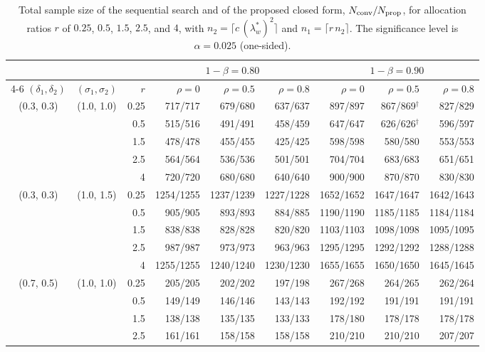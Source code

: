 \begin{table}[ht]
\centering
\footnotesize
\setlength{\tabcolsep}{4pt}
\caption{Total sample size of the sequential search and of the proposed closed form, $N_{\rm conv}/N_{\rm prop}$, for allocation ratios $r$ of $0.25$, $0.5$, $1.5$, $2.5$, and $4$, with $n_2 = \lceil c\,(\lambda_w^{*})^2 \rceil$ and $n_1 = \lceil r\,n_2 \rceil$. The significance level is $\alpha = 0.025$ (one-sided).}
\label{tab:allocation}
\begin{threeparttable}
\begin{tabular}{ccrrrrrrr}
\hline
 & & & \multicolumn{3}{c}{$1 - \beta = 0.80$} & \multicolumn{3}{c}{$1 - \beta = 0.90$} \\
\cline{4-6} \cline{7-9}
$(\delta_1, \delta_2)$ & $(\sigma_1, \sigma_2)$ & $r$ & $\rho = 0$ & $\rho = 0.5$ & $\rho = 0.8$ & $\rho = 0$ & $\rho = 0.5$ & $\rho = 0.8$ \\
\hline
(0.3, 0.3) & (1.0, 1.0) & 0.25 & 717/717 & 679/680 & 637/637 & 897/897 & 867/869$^{\dagger}$ & 827/829 \\
 &  & 0.5 & 515/516 & 491/491 & 458/459 & 647/647 & 626/626$^{\dagger}$ & 596/597 \\
 &  & 1.5 & 478/478 & 455/455 & 425/425 & 598/598 & 580/580 & 553/553 \\
 &  & 2.5 & 564/564 & 536/536 & 501/501 & 704/704 & 683/683 & 651/651 \\
 &  & 4 & 720/720 & 680/680 & 640/640 & 900/900 & 870/870 & 830/830 \\
(0.3, 0.3) & (1.0, 1.5) & 0.25 & 1254/1255 & 1237/1239 & 1227/1228 & 1652/1652 & 1647/1647 & 1642/1643 \\
 &  & 0.5 & 905/905 & 893/893 & 884/885 & 1190/1190 & 1185/1185 & 1184/1184 \\
 &  & 1.5 & 838/838 & 828/828 & 820/820 & 1103/1103 & 1098/1098 & 1095/1095 \\
 &  & 2.5 & 987/987 & 973/973 & 963/963 & 1295/1295 & 1292/1292 & 1288/1288 \\
 &  & 4 & 1255/1255 & 1240/1240 & 1230/1230 & 1655/1655 & 1650/1650 & 1645/1645 \\
(0.7, 0.5) & (1.0, 1.0) & 0.25 & 205/205 & 202/202 & 197/198 & 267/268 & 264/265 & 262/264 \\
 &  & 0.5 & 149/149 & 146/146 & 143/143 & 192/192 & 191/191 & 191/191 \\
 &  & 1.5 & 138/138 & 135/135 & 133/133 & 178/180 & 178/178 & 178/178 \\
 &  & 2.5 & 161/161 & 158/158 & 158/158 & 210/210 & 210/210 & 207/207 \\

\end{tabular}
\end{threeparttable}
\end{table}
